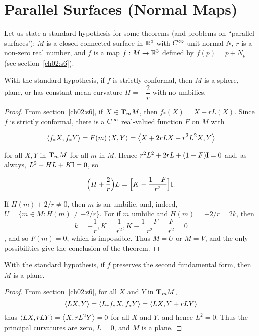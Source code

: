 \documentclass[../main]{subfiles}
\begin{document}
\section{Parallel Surfaces (Normal Maps)}\label{ch03:s3}
Let us state a standard hypothesis for some theorems (and problems on ``parallel surfaces'): $M$ is a closed connected surface in $\bbR^3$ with $\CInfty$ unit normal $N$, $r$ is a non-zero real number, and $f$ is a map $f : M \functionMaps \bbR^3$ defined by $f(p) = p + N_p$ (see section~\ref{ch02:s6}). 


\begin{theorem} \label{thm:ch3.3.1}
With the standard hypothesis, if $f$ is strictly conformal, then $M$ is a sphere, plane, or has constant mean curvature $H = -\dfrac{2}{r}$ with no umbilics. 
\end{theorem}

\begin{proof}
From section~\ref{ch02:s6}, if $X \in \tangentspace M m$, then $f_\ast(X) = X + r L(X)$. Since $f$ is strictly conformal, there is a $\CInfty$ real-valued function $F$ on $M$ with 

\[
\ip {f_\ast X} {f_\ast Y} = F(m) \ip X Y = \ip {X + 2 r L X + r^2 L^2 X} Y
\]

for all $X, Y$ in $\tangentspace M m$ for all $m$ in $M$. Hence $r^2 L^2 + 2 r L + (1 - F) \firstForm = 0$ and, as always, $L^2 - HL + K\firstForm = 0$, so 

\[
\Big(H + \dfrac{2}{r}\Big)L = \Big[K -\dfrac{1 - F}{r^2}\Big] \firstForm.
\]

If $H(m) + 2/r \ne 0$, then $m$ is an umbilic, and, indeed, \newline $U = \{m \in M : H(m) \ne -2/r\}$. For if $m$ umbilic and $H(m) = -2/r = 2k$, then \[k = -\dfrac{1}{r},K = \dfrac{1}{r^2},K - \dfrac{1 - F}{r^2} = \dfrac{F}{r^2} = 0\], and so $F(m) = 0$, which is impossible. Thus $M = U$ or $M = V$, and the only possibilities give the conclusion of the theorem.
\end{proof}



\begin{theorem} \label{thm:ch3.3.2}
With the standard hypothesis, if $f$ preserves the second fundamental form, then $M$ is a plane. 
\end{theorem}

\begin{proof}
From section~\ref{ch02:s6}, for all $X$ and $Y$ in $\tangentspace M m$, 
\[
\ip {LX} Y = \ip {L_r f_\ast X} {f_\ast Y} = \ip {L X} {Y + r LY}
\]
thus $\ip {LX} {r LY} = \ip X {r L^2 Y} = 0$ for all $X$ and $Y$, and hence $L^2 = 0$. Thus the principal curvatures are zero, $L = 0$, and $M$ is a plane. 
\end{proof}
\end{document}
